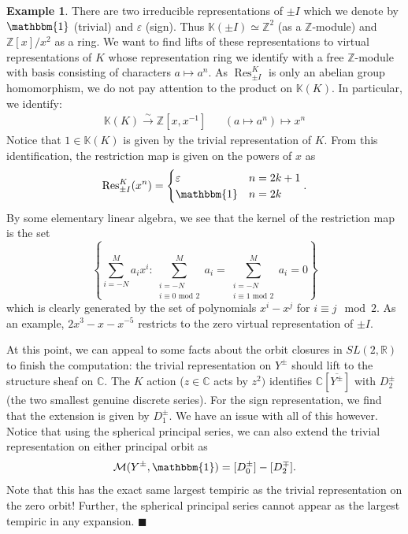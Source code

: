 \documentclass[letterpaper,twosided,11pt]{article}
\theoremstyle{plain}
\theoremstyle{definition}
\newtheorem{example}{Example}
\theoremstyle{remark}
\newcommand{\C}{\mathbb{C}}
\newcommand{\R}{\mathbb{R}}
\newcommand{\Z}{\mathbb{Z}}
\begin{document}
\begin{example}
	There are two irreducible representations of $\pm I$ which we denote by $\mathbbm{1}$ (trivial)  and $\varepsilon$ (sign). Thus $\mathbb{K}(\pm I)\simeq \Z^2$ (as a $\Z$-module) and $\Z[x]/{x^2}$ as a ring.  We want to find lifts of these representations to virtual representations of $K$ whose representation ring we identify with a free $\Z$-module with basis consisting of characters $a\mapsto a^n.$ As $\operatorname{Res}_{\pm I}^K$ is only an abelian group homomorphism, we do not pay attention to the product on $\mathbb{K}(K).$ In particular, we identify:  \begin{align}  \mathbb{K}(K)\overset{\sim}{\longrightarrow}\Z[x,x^{-1}] && (a\mapsto a^n)\mapsto x^n  \end{align}  Notice that $1\in \mathbb{K}(K)$ is given by the trivial representation of $K.$ From this identification, the restriction map is given on the powers of $x$ as \[ \operatorname{Res}^K_{\pm I} (x^n)=\begin{cases}  \varepsilon & n=2k+1\\ \mathbbm{1} & n=2k	\end{cases} .\]
By some elementary linear algebra, we see that the kernel of the restriction map is the set \[ \left\{ \sum_{i=-N}^M a_ix^i: \sum_{\substack{i=-N \\ i\equiv 0\text{ mod } 2}}^M a_i=\sum_{\substack{i=-N \\ i \equiv 1\text{ mod }  2}}^M a_i=0  \right\}\]
which is clearly generated by the set of polynomials $x^i-x^j$ for $i\equiv j\mod 2.$ As an example, $2x^3-x-x^{-5}$ restricts to the zero virtual representation of $\pm I$. 

At this point, we can appeal to some facts about the orbit closures in $SL(2,\R)$ to finish the computation: the trivial representation on $Y^\pm$ should lift to the structure sheaf on $\C.$ The $K$ action ($z\in \C$ acts by $z^2)$ identifies $\C[\overline{Y^\pm}]$ with $D_2^\pm$ (the two smallest genuine discrete series). For the sign representation, we find that the extension is given by $D_1^\pm.$ We have an issue with all of this however. Notice that using the spherical principal series, we can also extend the trivial representation on either principal orbit as \[\mathcal{M}(Y^\pm,\mathbbm{1})=[D_0^\pm]-[D_2^{\mp}].\]
Note that this has the exact same largest tempiric as the trivial representation on the zero orbit! Further, the spherical principal series cannot appear as the largest tempiric in any expansion. \hfill $\blacksquare$ \end{example} 
\end{document}
